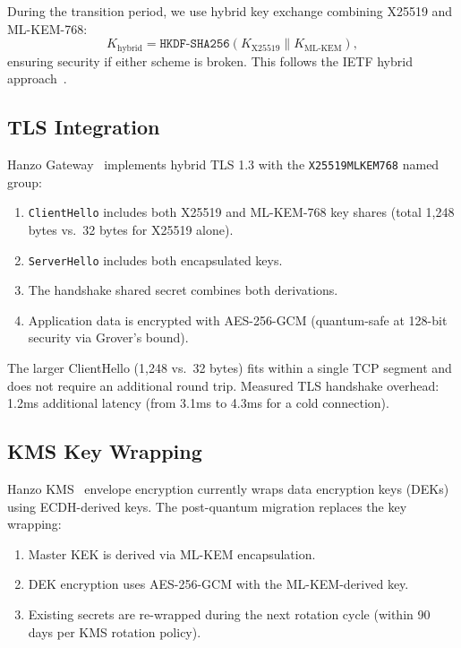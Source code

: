 During the transition period, we use hybrid key exchange combining X25519 and
ML-KEM-768:
\begin{equation}
K_{\text{hybrid}} = \texttt{HKDF-SHA256}(K_{\text{X25519}} \| K_{\text{ML-KEM}}),
\end{equation}
ensuring security if either scheme is broken. This follows the IETF hybrid
approach~\cite{hybridtls}.

\subsection{TLS Integration}

Hanzo Gateway~\cite{hanzogateway} implements hybrid TLS 1.3 with the
\texttt{X25519MLKEM768} named group:
\begin{enumerate}[leftmargin=1.4em]
    \item \texttt{ClientHello} includes both X25519 and ML-KEM-768 key shares
    (total 1,248 bytes vs.\ 32 bytes for X25519 alone).
    \item \texttt{ServerHello} includes both encapsulated keys.
    \item The handshake shared secret combines both derivations.
    \item Application data is encrypted with AES-256-GCM (quantum-safe at
    128-bit security via Grover's bound).
\end{enumerate}

\begin{remark}
The larger ClientHello (1,248 vs.\ 32 bytes) fits within a single TCP segment
and does not require an additional round trip. Measured TLS handshake overhead:
1.2ms additional latency (from 3.1ms to 4.3ms for a cold connection).
\end{remark}

\subsection{KMS Key Wrapping}

Hanzo KMS~\cite{hanzokms} envelope encryption currently wraps data encryption
keys (DEKs) using ECDH-derived keys. The post-quantum migration replaces the
key wrapping:
\begin{enumerate}[leftmargin=1.4em]
    \item Master KEK is derived via ML-KEM encapsulation.
    \item DEK encryption uses AES-256-GCM with the ML-KEM-derived key.
    \item Existing secrets are re-wrapped during the next rotation cycle
    (within 90 days per KMS rotation policy).
\end{enumerate}


